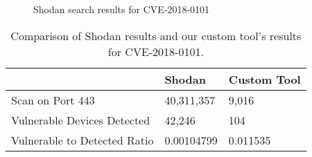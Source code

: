 \begin{figure}[!h]
\begin{center}
\caption{Shodan search results for CVE-2018-0101}
\label{fig:shodan-cisco}
\end{center}
\end{figure}

\begin{table}[!h]
\begin{tabular}{l|l|l}
                             & Shodan     & Custom Tool \\ \hline
Scan on Port 443             & 40,311,357 & 9,016       \\ \hline
Vulnerable Devices Detected  & 42,246     & 104         \\ \hline
Vulnerable to Detected Ratio & 0.00104799 & 0.011535    \\
\end{tabular}
\caption{Comparison of Shodan results and our custom tool's results for CVE-2018-0101.}
\label{tab:cve-2018}
\end{table}
